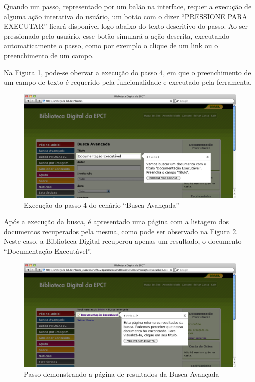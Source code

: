 Quando um passo, representado por um balão na interface, requer a execução de alguma ação interativa do usuário, um botão com o dizer “PRESSIONE PARA EXECUTAR” ficará disponível logo abaixo do texto descritivo do passo. Ao ser pressionado pelo usuário, esse botão simulará a ação descrita, executando automaticamente o passo, como por exemplo o clique de um link ou o preenchimento de um campo.

Na Figura \ref{tour_5}, pode-se obervar a execução do passo 4, em que o preenchimento de um campo de texto é requerido pela funcionalidade e executado pela ferramenta.

\begin{figure}[ht]
    \centering
    \includegraphics[width=0.9 \textwidth]{figuras/tour_5}
    \caption{Execução do passo 4 do cenário “Busca Avançada”}
    \label{tour_5}
\end{figure}

Após a execução da busca, é apresentado uma página com a listagem dos documentos recuperados pela mesma, como pode ser observado na Figura \ref{tour_6}. Neste caso, a Biblioteca Digital recuperou apenas um resultado, o documento “Documentação Executável”.

\begin{figure}[ht]
    \centering
    \includegraphics[width=0.9 \textwidth]{figuras/tour_6}
    \caption{Passo demonstrando a página de resultados da Busca Avançada}
    \label{tour_6}
\end{figure}

